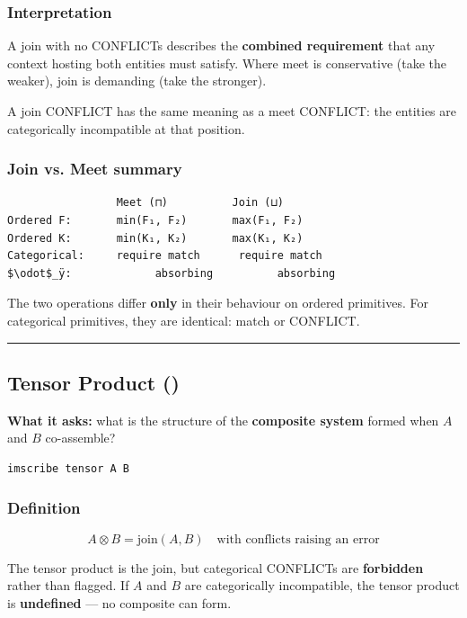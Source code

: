 \documentclass[12pt,a4paper]{article}
\begin{document}
\subsubsection{Interpretation}

A join with no CONFLICTs describes the \textbf{combined requirement} that any context hosting both entities must satisfy. Where meet is conservative (take the weaker), join is demanding (take the stronger).

A join CONFLICT has the same meaning as a meet CONFLICT: the entities are categorically incompatible at that position.

\subsubsection{Join vs. Meet summary}

\begin{lstlisting}
                 Meet (⊓)          Join (⊔)
Ordered F:       min(F₁, F₂)       max(F₁, F₂)
Ordered K:       min(K₁, K₂)       max(K₁, K₂)
Categorical:     require match      require match
$\odot$_ÿ:             absorbing          absorbing
\end{lstlisting}

The two operations differ \textbf{only} in their behaviour on ordered primitives. For categorical primitives, they are identical: match or CONFLICT.

\begin{center}
\rule{0.5\textwidth}{0.4pt}
\end{center}

\subsection{Tensor Product (\otimes)}

\textbf{What it asks:} what is the structure of the \textbf{composite system} formed when $A$ and $B$ co-assemble?

\begin{lstlisting}
imscribe tensor A B
\end{lstlisting}

\subsubsection{Definition}

\[A \otimes B = \text{join}(A, B) \quad \text{with conflicts raising an error}\]

The tensor product is the join, but categorical CONFLICTs are \textbf{forbidden} rather than flagged. If $A$ and $B$ are categorically incompatible, the tensor product is \textbf{undefined} --- no composite can form.
\end{document}
